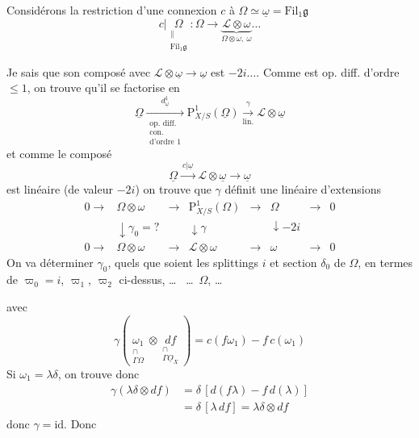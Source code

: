 \documentclass[11pt,a4paper]{article}
\begin{document}
Considérons la restriction d'une connexion $c$ à $\Omega \simeq \underline{\omega} = \mathrm{Fil}_1\mathfrak{g}$
\[
c|\underset{\substack{\|\\ \mathrm{Fil}_1\mathfrak{g}}}{\Omega} : \Omega \longrightarrow \underbrace{\mathcal{L}\otimes\omega}_{\Omega\otimes\omega,\ \omega} \ldots
\]

Je sais que son composé avec $\mathcal{L}\otimes\underline{\omega} \to \underline{\omega}$ est $-2i\ldots$.  Comme   est op. diff. d'ordre $\leq 1$, on trouve qu'il se factorise en
\[
\underline{\Omega} \xrightarrow[\substack{\text{op. diff.}\\ \text{con.}\\ \text{d'ordre } 1}]{\ d^1_{\underline{\omega}}\ } \mathrm{P}^1_{X/S}(\underline{\Omega}) \xrightarrow[\text{lin.}]{\ \gamma\ } \mathcal{L}\otimes\underline{\omega}
\]
et comme le composé 
\[
\underline{\Omega} \xrightarrow{\ c|\underline{\omega}\ } \mathcal{L}\otimes\underline{\omega} \to \underline{\omega}
\]
est linéaire (de valeur $-2i$) on trouve que $\gamma$ définit une \ill{} linéaire d'extensions
\[
\begin{array}{ccccccccc}
0 \to & \Omega\otimes\omega & \to & \mathrm{P}^1_{X/S}(\Omega) & \to & \Omega & \to & 0\\
& \downarrow{\scriptstyle \gamma_0 = ?} & & \downarrow{\scriptstyle \gamma} & & \downarrow{\scriptstyle -2i} & &\\
0 \to & \Omega\otimes\omega & \to & \mathcal{L}\otimes\omega & \to & \omega & \to & 0
\end{array}
\]
On va déterminer $\gamma_0$, quels que soient les splittings $i$ et section $\delta_0$ de $\Omega$, en termes de $\varpi_0 = i$, $\varpi_1$, $\varpi_2$ ci-dessus, \struck{\ill{}}   \ldots\   \ldots\ $\Omega$, \ldots


avec
\[
\gamma(\underset{\substack{\cap\\ \Gamma\Omega}}{\omega_1}\otimes \underset{\substack{\cap\\ \Gamma\underline{O}_X}}{df}) = c(f\omega_1) - f\,c(\omega_1)
\]
Si $\omega_1 = \lambda\delta$, on trouve donc
\[
\begin{aligned}
\gamma(\lambda\delta\otimes df) &= \delta\,[d(f\lambda) - f\,d(\lambda)]\\
&= \delta\,[\lambda\,df] = \lambda\delta\otimes df
\end{aligned}
\]
donc $\gamma = \mathrm{id}$. Donc
\end{document}
